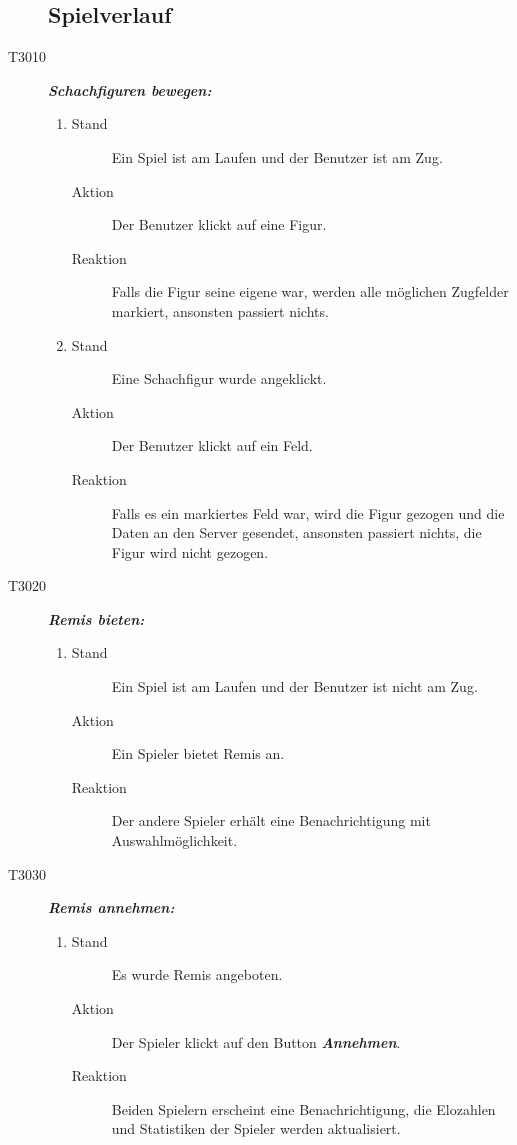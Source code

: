 \documentclass[parskip=full]{scrartcl}
\begin{document}
\begin{description}
		\subsection{Spielverlauf}
		\item[T3010] \textbf{\textit{Schachfiguren bewegen: }} 
		\begin{enumerate}
			\item 
			\begin{description}
				\item[Stand] Ein Spiel ist am Laufen und der Benutzer ist am Zug.
				\item[Aktion] Der Benutzer klickt auf eine  Figur.
				\item[Reaktion] Falls die Figur seine eigene war, werden alle möglichen Zugfelder markiert, ansonsten passiert nichts.
			\end{description}
			\item 
			\begin{description}
				\item[Stand] Eine Schachfigur wurde angeklickt.
				\item[Aktion] Der Benutzer klickt auf ein  Feld.
				\item[Reaktion] Falls es ein markiertes Feld war, wird die Figur gezogen und die Daten an den Server gesendet, ansonsten passiert nichts, die Figur wird nicht gezogen.
			\end{description}
		\end{enumerate}
		
		
		\item[T3020] \textbf{\textit{Remis bieten: }} 
		\begin{enumerate}
			\item 
			\begin{description}
				\item[Stand] Ein Spiel ist am Laufen und der Benutzer ist nicht am Zug.
				\item[Aktion] Ein Spieler bietet Remis an.
				\item[Reaktion] Der andere Spieler erhält eine Benachrichtigung mit Auswahlmöglichkeit.
			\end{description}
		\end{enumerate}
		
		\item[T3030] \textbf{\textit{Remis annehmen: }} 
		\begin{enumerate}
			\item 
			\begin{description}
				\item[Stand] Es wurde Remis angeboten. 
				\item[Aktion] Der Spieler klickt auf den Button \textbf{\textit{Annehmen}}. 
				\item[Reaktion] Beiden Spielern erscheint eine Benachrichtigung, die Elozahlen und Statistiken der Spieler werden aktualisiert.
			\end{description}
		\end{enumerate}
		

\end{description}
\end{document}
